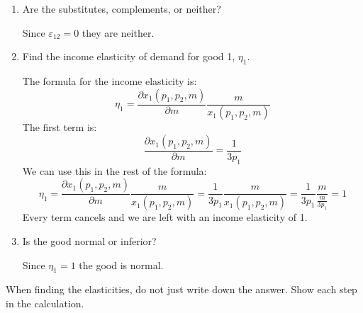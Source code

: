 \documentclass[12pt]{article}
\newcounter{question}[section]
\newenvironment{subquestions}{
  \begin{enumerate}[label=(\roman*)]}{\end{enumerate}}
\begin{document}
\begin{subquestions}
    \textcolor{solution-color}{
    Since $p_2$ doesn't show up in demand:
    \[
      \varepsilon_{12}=\frac{\partial x_1\left( p_1,p_2,m \right)}{\partial p_2}
      \frac{p_2}{x_1\left( p_1,p_2,m
      \right)}=0\times \frac{p_2}{x_1\left( p_1,p_2,m
      \right)}=0
    \]
  }
  \item Are the substitutes, complements, or neither?

    \textcolor{solution-color}{
      Since $\varepsilon_{12}=0$ they are neither.
  }
  \item Find the income elasticity of demand for good 1, $\eta_1$.

    \textcolor{solution-color}{
      The formula for the income elasticity is:
    \[
      \eta_1=\frac{\partial x_1\left( p_1,p_2,m \right)}{\partial m}
      \frac{m}{x_1\left( p_1,p_2,m
      \right)}
    \]
    The first term is:
    \[
      \frac{\partial x_1\left( p_1,p_2,m \right)}{\partial m}=\frac{1}{3p_1}
    \]
    We can use this in the rest of the formula:
    \[
      \eta_1=\frac{\partial x_1\left( p_1,p_2,m \right)}{\partial m}
      \frac{m}{x_1\left( p_1,p_2,m
      \right)}=
      \frac{1}{3p_1}\frac{m}{x_1\left( p_1,p_2,m \right)}=
      \frac{1}{3p_1}\frac{m}{\frac{m}{3p_1}}=1
    \]
    Every term cancels and we are left with an income elasticity of 1.
  }
  \item Is the good normal or inferior?

    \textcolor{solution-color}{
      Since $\eta_1=1$ the good is normal.
  }
\end{subquestions}
When finding the elasticities, do not just write down the answer. Show each
step in the calculation.
\end{document}
